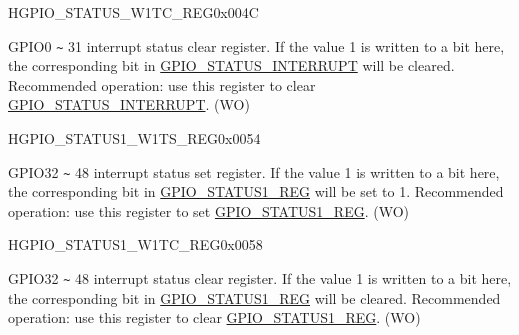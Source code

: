 \begin{register}{H}{GPIO\_STATUS\_W1TC\_REG}{0x{}004C}\label{regdesc:GPIOSTATUSW1TCREG}
%
\regnewline%
\begin{regdesc}\begin{reglist}
\label{fielddesc:GPIOSTATUSW1TC}\item [GPIO\_STATUS\_W1TC] GPIO0 \verb+~+ 31 interrupt status clear register. If the value 1 is written to a bit here, the corresponding bit in \hyperref[fielddesc:GPIOSTATUSINTERRUPT]{GPIO\_STATUS\_INTERRUPT} will be cleared. Recommended operation: use this register to clear \hyperref[fielddesc:GPIOSTATUSINTERRUPT]{GPIO\_STATUS\_INTERRUPT}. (WO)
\end{reglist}\end{regdesc}
\end{register}


\begin{register}{H}{GPIO\_STATUS1\_W1TS\_REG}{0x{}0054}\label{regdesc:GPIOSTATUS1W1TSREG}
%
%
\regnewline%
\begin{regdesc}\begin{reglist}
\label{fielddesc:GPIOSTATUS1W1TS}\item [GPIO\_STATUS1\_W1TS] GPIO32 \verb+~+ 48 interrupt status set register. If the value 1 is written to a bit here, the corresponding bit in \hyperref[regdesc:GPIOSTATUS1REG]{GPIO\_STATUS1\_REG} will be set to 1. Recommended operation: use this register to set \hyperref[regdesc:GPIOSTATUS1REG]{GPIO\_STATUS1\_REG}. (WO)
\end{reglist}\end{regdesc}
\end{register}


\begin{register}{H}{GPIO\_STATUS1\_W1TC\_REG}{0x{}0058}\label{regdesc:GPIOSTATUS1W1TCREG}
%
%
\regnewline%
\begin{regdesc}\begin{reglist}
\label{fielddesc:GPIOSTATUS1W1TC}\item [GPIO\_STATUS1\_W1TC] GPIO32 \verb+~+ 48 interrupt status clear register. If the value 1 is written to a bit here, the corresponding bit in \hyperref[regdesc:GPIOSTATUS1REG]{GPIO\_STATUS1\_REG} will be cleared. Recommended operation: use this register to clear \hyperref[regdesc:GPIOSTATUS1REG]{GPIO\_STATUS1\_REG}. (WO)
\end{reglist}\end{regdesc}
\end{register}


